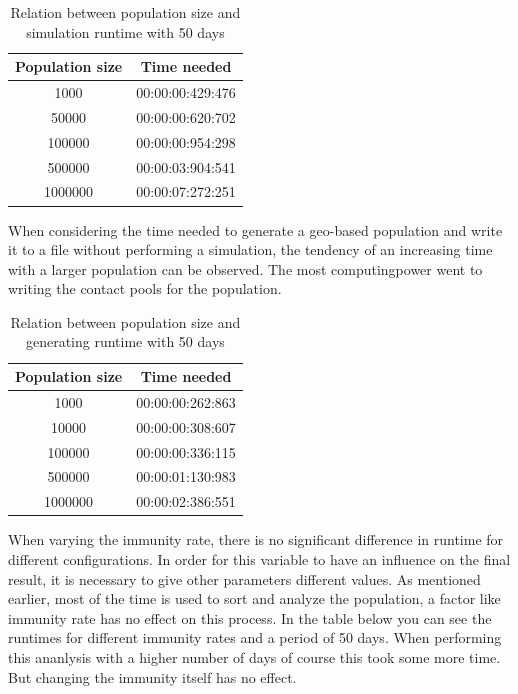 \documentclass[runningheads]{llncs}
\begin{document}
	\begin{table}
		\caption{Relation between population size and simulation runtime with 50 days}
		\begin{center}
			\begin{tabular}{ | c | c |}
				\hline
				Population size & Time needed \\ \hline
				1000 & 00:00:00:429:476 \\ \hline
				50000 & 00:00:00:620:702 \\ \hline
				100000 & 00:00:00:954:298 \\ \hline
				500000 & 00:00:03:904:541 \\ \hline
				1000000 & 00:00:07:272:251 \\
				\hline	
			\end{tabular}
		\end{center} 
	\end{table}
	\newpage
	\noindent
	When considering the time needed to generate a geo-based population and write it to a file without performing a simulation, the tendency of an increasing time with a larger population can be observed. The most computingpower went to writing the contact pools for the population.
	\begin{table}
		\caption{Relation between population size and generating runtime with 50 days}
		\begin{center}
			\begin{tabular}{ | c | c |}
				\hline
				Population size & Time needed \\ \hline
				1000 & 00:00:00:262:863 \\ \hline
				10000 & 00:00:00:308:607 \\ \hline
				100000 & 00:00:00:336:115 \\ \hline
				500000 & 00:00:01:130:983 \\ \hline
				1000000 & 00:00:02:386:551 \\
				\hline
			\end{tabular}
		\end{center}
	\end{table}
	
	\noindent
	When varying the immunity rate, there is no significant difference in runtime for different configurations. In order for this variable to have an influence on the final result, it is necessary to give other parameters different values.  As mentioned earlier, most of the time is used to sort and analyze the population, a factor like immunity rate has no effect on this process. In the table below you can see the runtimes for different immunity rates and a period of 50 days. When performing this ananlysis with a higher number of days of course this took some more time. But changing the immunity itself has no effect.
	
\end{document}

